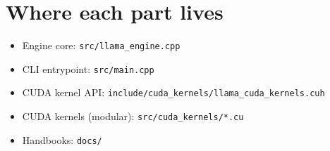 \documentclass[11pt]{article}
\begin{document}


\section{Where each part lives}
\begin{itemize}[leftmargin=*]
  \item Engine core: \texttt{src/llama\_engine.cpp}
  \item CLI entrypoint: \texttt{src/main.cpp}
  \item CUDA kernel API: \texttt{include/cuda\_kernels/llama\_cuda\_kernels.cuh}
  \item CUDA kernels (modular): \texttt{src/cuda\_kernels/*.cu}
  \item Handbooks: \texttt{docs/}
\end{itemize}
\end{document}
